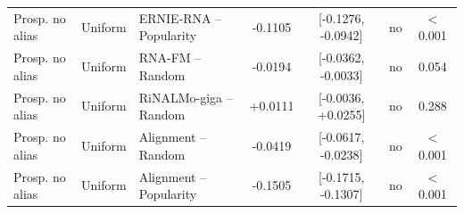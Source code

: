 {\begin{longtable}{lllcccc}
Prosp. no alias & Uniform & ERNIE-RNA -- Popularity & -0.1105 & [-0.1276, -0.0942] & no & $<$0.001\\
Prosp. no alias & Uniform & RNA-FM -- Random & -0.0194 & [-0.0362, -0.0033] & no & 0.054\\
Prosp. no alias & Uniform & RiNALMo-giga -- Random & +0.0111 & [-0.0036, +0.0255] & no & 0.288\\
Prosp. no alias & Uniform & Alignment -- Random & -0.0419 & [-0.0617, -0.0238] & no & $<$0.001\\
Prosp. no alias & Uniform & Alignment -- Popularity & -0.1505 & [-0.1715, -0.1307] & no & $<$0.001\\
\bottomrule
\end{longtable}}

